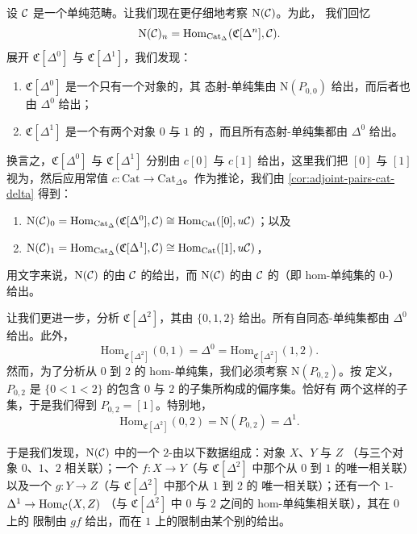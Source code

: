 \begin{observation}\label{obs:simplicial-nerve-detail}
设 $\mathcal{C}$ 是一个单纯\trEnrichment{}范畴。让我们现在更仔细地考察\trSimplicialSet{} $\mathrm{N}(\mathcal{C})$。为此，
我们回忆
\[
\mathrm{N}(\mathcal{C})_n = \mathrm{Hom}_{\mathrm{Cat}_{\Delta}}(\mathfrak{C}[\Delta^n], \mathcal{C}).
\]
展开\trSimplicialCategory{} $\mathfrak{C}[\Delta^0]$ 与 $\mathfrak{C}[\Delta^1]$，我们发现：
\begin{enumerate}[label=(\arabic*)]
  \item $\mathfrak{C}[\Delta^0]$ 是一个只有一个对象的\trSimplicialCategory{}，其
  态射-单纯集由 $\mathrm{N}(P_{0,0})$ 给出，而后者也由 $\Delta^0$ 给出；
  \item $\mathfrak{C}[\Delta^1]$ 是一个有两个对象 $0$ 与 $1$ 的%
  \trSimplicialCategory{}，而且所有态射-单纯集都由 $\Delta^0$ 给出。
\end{enumerate}

换言之，$\mathfrak{C}[\Delta^0]$ 与 $\mathfrak{C}[\Delta^1]$ 分别由 $c[0]$ 与 $c[1]$
给出，这里我们把 $[0]$ 与 $[1]$ 视为\trCategory{}，然后应用常值\trFunctor{}%
$c\colon \mathrm{Cat} \to \mathrm{Cat}_{\Delta}$。作为推论，我们由%
\cref{cor:adjoint-pairs-cat-delta} 得到：
\begin{enumerate}[label=(\arabic*)]
  \item $\mathrm{N}(\mathcal{C})_0 = \mathrm{Hom}_{\mathrm{Cat}_{\Delta}} (\mathfrak{C}[\Delta^0], \mathcal{C}) \cong \mathrm{Hom}_{\mathrm{Cat}}([0], u\mathcal{C})$；以及
  \item $\mathrm{N}(\mathcal{C})_1 = \mathrm{Hom}_{\mathrm{Cat}_{\Delta}} (\mathfrak{C}[\Delta^1], \mathcal{C}) \cong \mathrm{Hom}_{\mathrm{Cat}}([1], u\mathcal{C})$，
\end{enumerate}
用文字来说，$\mathrm{N}(\mathcal{C})$ 的\trObject{}由 $\mathcal{C}$ 的\trObject{}给出，而
$\mathrm{N}(\mathcal{C})$ 的\trMorphism{}由 $\mathcal{C}$ 的\trMorphism{}（即 hom-单纯集的 $0$-\trSimplex{}）
给出。

让我们更进一步，分析\trSimplicialCategory{} $\mathfrak{C}[\Delta^2]$，其\trObject{}由
$\{0, 1, 2\}$ 给出。所有自同态-单纯集都由 $\Delta^0$ 给出。此外，
\[
\mathrm{Hom}_{\mathfrak{C}[\Delta^2]}(0, 1) = \Delta^0 =
\mathrm{Hom}_{\mathfrak{C}[\Delta^2]}(1, 2).
\]
然而，为了分析从 $0$ 到 $2$ 的 hom-单纯集，我们必须考察 $\mathrm{N}(P_{0,2})$。按
定义，$P_{0,2}$ 是 $\{0 < 1 < 2\}$ 的包含 $0$ 与 $2$ 的子集所构成的偏序集。恰好有
两个这样的子集，于是我们得到 $P_{0,2} = [1]$。特别地，
\[
\mathrm{Hom}_{\mathfrak{C}[\Delta^2]}(0, 2) = \mathrm{N}(P_{0,2}) = \Delta^1.
\]

于是我们发现，$\mathrm{N}(\mathcal{C})$ 中的一个 $2$-\trSimplex{}由以下数据组成：对象 $X$、$Y$ 与 $Z$
（与三个对象 $0$、$1$、$2$ 相关联）；一个\trMorphism{} $f\colon X \to Y$（与
$\mathfrak{C}[\Delta^2]$ 中那个从 $0$ 到 $1$ 的唯一\trMorphism{}相关联）以及一个%
\trMorphism{} $g\colon Y \to Z$（与 $\mathfrak{C}[\Delta^2]$ 中那个从 $1$ 到 $2$ 的
唯一\trMorphism{}相关联）；还有一个 $1$-\trSimplex{} $\Delta^1 \to \mathrm{Hom}_{\mathcal{C}}(X, Z)$
（与 $\mathfrak{C}[\Delta^2]$ 中 $0$ 与 $2$ 之间的 hom-单纯集相关联），其在 $0$ 上的
限制由 $gf$ 给出，而在 $1$ 上的限制由某个别的\trMorphism{}给出。


\end{observation}
